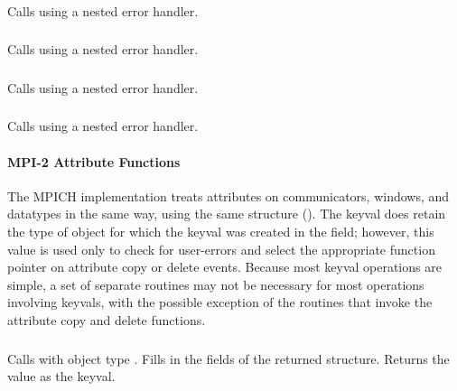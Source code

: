 \documentclass{article}
\begin{document}
\subsubsection{}
Calls  using a nested error handler.

\subsubsection{}
Calls  using a nested error handler.

\subsubsection{}
Calls  using a nested error handler.

\subsubsection{}
Calls  using a nested error handler.

\paragraph{MPI-2 Attribute Functions}
The MPICH implementation treats attributes on communicators, windows,
and datatypes in the same way, using the same structure
().  The keyval does retain the type of object for
which the keyval was created in the  field;
however, this value is used only to check for user-errors and select
the appropriate function pointer on attribute copy or delete events.  
Because most keyval operations are simple, a set of separate routines
may not be necessary for most operations involving keyvals, with the
possible exception of the
routines that invoke the attribute copy and delete functions.

\subsubsection{}
Calls  with object type
.  Fills in the fields of the returned
 structure.  Returns the 
value as the keyval.

\end{document}
